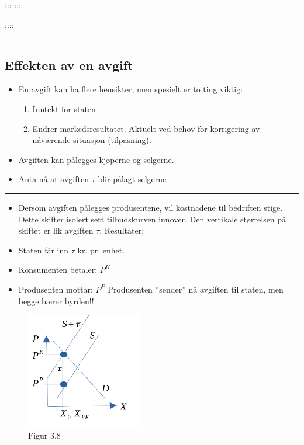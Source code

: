 \documentclass[
  letterpaper,
  DIV=11,
  numbers=noendperiod]{scrartcl}
\providecommand{\tightlist}{%
  \setlength{\itemsep}{0pt}\setlength{\parskip}{0pt}}\usepackage{longtable,booktabs,array}
\begin{document}
::: :::

::::

\begin{center}\rule{0.5\linewidth}{0.5pt}\end{center}

\subsection{Effekten av en avgift}\label{effekten-av-en-avgift}

\begin{itemize}
\item
  En avgift kan ha flere hensikter, men spesielt er to ting viktig:

  \begin{enumerate}
  \def\labelenumi{\roman{enumi})}
  \tightlist
  \item
    Inntekt for staten
  \item
    Endrer markedsresultatet. Aktuelt ved behov for korrigering av
    nåværende situasjon (tilpasning).
  \end{enumerate}
\item
  Avgiften kan pålegges kjøperne og selgerne.
\item
  Anta nå at avgiften \(\tau\) blir pålagt selgerne
\end{itemize}

\begin{center}\rule{0.5\linewidth}{0.5pt}\end{center}

\begin{itemize}
\tightlist
\item
  Dersom avgiften pålegges produsentene, vil kostnadene til bedriften
  stige. Dette skifter isolert sett tilbudskurven innover. Den vertikale
  størrelsen på skiftet er lik avgiften \(\tau\). Resultater:
\item
  Staten får inn \(\tau\) kr. pr. enhet.
\item
  Konsumenten betaler: \(P^K\)
\item
  Produsenten mottar: \(P^P\) Produsenten ''sender'' nå avgiften til
  staten, men begge bærer byrden!!
\end{itemize}

\begin{figure}[H]

{\centering \includegraphics[width=0.45\textwidth,height=\textheight]{drawio/telikevekt_avg.png}

}

\caption{Figur 3.8}

\end{figure}%
\end{document}
